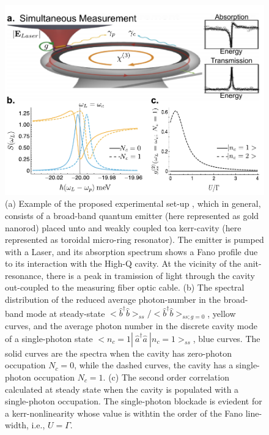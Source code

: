 \documentclass[12pt]{article}
\begin{document}
\begin{figure}[H]
  \centering
  \includegraphics[width=1\linewidth]{fig.pdf}
  \caption{(a) Example of the proposed experimental set-up
  \cite{pan2019elucidating}, which in general, consists of a broad-band
  quantum emitter (here represented as gold nanorod) placed unto\textemdash
  and weakly coupled to\textemdash a kerr-cavity (here represented as
  toroidal micro-ring resonator). The emitter is pumped with a
  Laser, and its absorption spectrum shows a Fano profile due
  to its interaction with the High-Q cavity. At the vicinity of the
  anit-resonance, there is a peak in tramission of light through the cavity
  out-coupled to the measuring fiber optic cable. (b) The spectral distribution
  of the reduced average photon-number in the broad-band mode at steady-state
  $<\hat{b}^{\dagger}\hat{b}>_{ss}/<\hat{b}^{\dagger}\hat{b}>_{ss; g=0}$,
  yellow curves, and the average photon number in the discrete cavity mode of a
  single-photon state $<n_c=1|\: \hat{a}^{\dagger}\hat{a} \: |n_c=1>_{ss}$, 
  blue curves. The solid curves are the spectra when the cavity has zero-photon
  occupation $N_c=0$, while the dashed curves, the cavity has a single-photon
  occupation $N_c=1$. (c) The second order correlation calculated at steady
  state when the cavity is populated with a single-photon occupation.
  The single-photon blockade is eviedent for a kerr-nonlinearity whose value is
  withtin the order of the Fano line-width, i.e., $U=\Gamma$.
  }
  \label{fig}
\end{figure}
\end{document}
